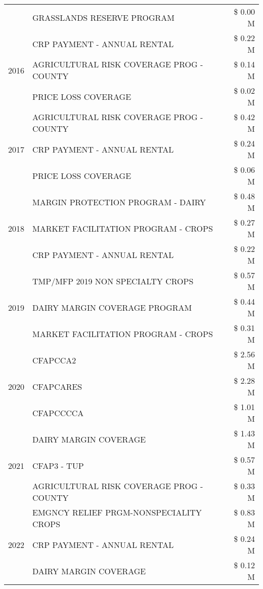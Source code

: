 \begin{tabular}{llr}
 & GRASSLANDS RESERVE PROGRAM & \$ 0.00 M \\
\cline{1-3}
\multirow[t]{3}{*}{2016} & CRP PAYMENT - ANNUAL RENTAL & \$ 0.22 M \\
 & AGRICULTURAL RISK COVERAGE PROG - COUNTY & \$ 0.14 M \\
 & PRICE LOSS COVERAGE & \$ 0.02 M \\
\cline{1-3}
\multirow[t]{3}{*}{2017} & AGRICULTURAL RISK COVERAGE PROG - COUNTY & \$ 0.42 M \\
 & CRP PAYMENT - ANNUAL RENTAL & \$ 0.24 M \\
 & PRICE LOSS COVERAGE & \$ 0.06 M \\
\cline{1-3}
\multirow[t]{3}{*}{2018} & MARGIN PROTECTION PROGRAM - DAIRY & \$ 0.48 M \\
 & MARKET FACILITATION PROGRAM - CROPS & \$ 0.27 M \\
 & CRP PAYMENT - ANNUAL RENTAL & \$ 0.22 M \\
\cline{1-3}
\multirow[t]{3}{*}{2019} & TMP/MFP 2019 NON SPECIALTY CROPS & \$ 0.57 M \\
 & DAIRY MARGIN COVERAGE PROGRAM & \$ 0.44 M \\
 & MARKET FACILITATION PROGRAM - CROPS & \$ 0.31 M \\
\cline{1-3}
\multirow[t]{3}{*}{2020} & CFAPCCA2 & \$ 2.56 M \\
 & CFAPCARES & \$ 2.28 M \\
 & CFAPCCCCA & \$ 1.01 M \\
\cline{1-3}
\multirow[t]{3}{*}{2021} & DAIRY MARGIN COVERAGE & \$ 1.43 M \\
 & CFAP3 - TUP & \$ 0.57 M \\
 & AGRICULTURAL RISK COVERAGE PROG - COUNTY & \$ 0.33 M \\
\cline{1-3}
\multirow[t]{3}{*}{2022} & EMGNCY RELIEF PRGM-NONSPECIALITY CROPS & \$ 0.83 M \\
 & CRP PAYMENT - ANNUAL RENTAL & \$ 0.24 M \\
 & DAIRY MARGIN COVERAGE & \$ 0.12 M \\
\cline{1-3}
\bottomrule
\end{tabular}
